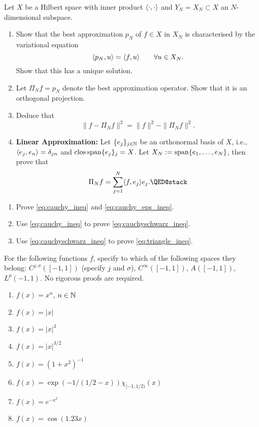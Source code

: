 \begin{exercise}
  \label{exr:prelims:bestapprox_hilbert}
  Let $X$ be a Hilbert space with inner product $\langle\cdot,\cdot\rangle$ and
  $Y_N = X_N \subset X$ an $N$-dimensional subspace.
  \begin{enumerate} \ilist
  \item Show that the best approximation $p_N$ of $f \in X$ in $X_N$ is characterised
    by the variational equation
    \[
         \langle p_N, u \rangle = \langle f, u \rangle \qquad \forall u \in X_N.
    \]
    Show that this has a unique solution.

    \item Let $\Pi_N f = p_N$ denote the best approximation operator. Show
    that it is an orthogonal projection.

    \item Deduce that
    \[
        \| f - \Pi_N f \|^2 = \|f\|^2 - \| \Pi_N f \|^2.
    \]

    \item {\bf Linear Approximation: }  Let $\{ e_j \}_{j \in \mathbb{N}}$ be an
    orthonormal basis of $X$, i.e., $\langle e_j, e_n \rangle = \delta_{jn}$ and ${\rm
    clos}\,{\rm span}\{e_j\}_j = X$. Let $X_N := {\rm span}\{e_1, \dots, e_N\}$, then prove that 
    \[
        \Pi_N f = \sum_{j = 1}^N \< f, e_j \> e_j. \qedhere
    \]
  \end{enumerate}
\end{exercise}


\begin{exercise} \label{exr:prelims:inequalities}
  \begin{enumerate} \ilist
  \item Prove \eqref{eq:cauchy_ineq} and
  \eqref{eq:cauchy_eps_ineq}.
  \item Use \eqref{eq:cauchy_ineq} to prove
  \eqref{eq:cauchyschwarz_ineq}.
  \item Use \eqref{eq:cauchyschwarz_ineq} to prove \eqref{eq:triangle_ineq}.
  \qedhere
  \end{enumerate}
\end{exercise}


\begin{exercise}   \label{exr:prelims:functions}
  For the following functions $f$, specify to which of the following
  spaces they belong: $C^{j,\sigma}([-1,1])$ (specify $j$ and $\sigma$),
  $C^\infty([-1,1])$, $A([-1,1])$, $L^p(-1,1)$. No rigorous proofs are
  required.
  \begin{enumerate} \ilist
    \item $f(x) = x^n$, $n \in \mathbb{N}$
    \item $f(x) = |x|$
    \item $f(x) = |x|^{3}$
    \item $f(x) = |x|^{3/2}$
    \item $f(x) = (1+x^2)^{-1}$
    \item $f(x) = \exp( - 1 / (1/2-x) ) \chi_{[-1,1/2)}(x)$
    \item $f(x) = e^{-x^2}$
    \item $f(x) = \cos(1.23 x)$ \qedhere
  \end{enumerate}
\end{exercise}

